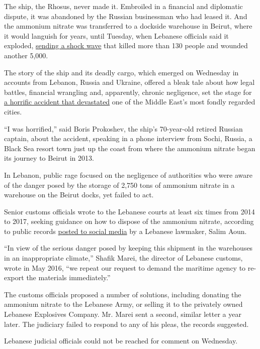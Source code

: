 The ship, the Rhosus, never made it. Embroiled in a financial and
diplomatic dispute, it was abandoned by the Russian businessman who had
leased it. And the ammonium nitrate was transferred to a dockside
warehouse in Beirut, where it would languish for years, until Tuesday,
when Lebanese officials said it exploded,
\href{https://www.nytimes.com/2020/08/04/world/middleeast/lebanon-explosion.html}{sending
a shock wave} that killed more than 130 people and wounded another
5,000.

The story of the ship and its deadly cargo, which emerged on Wednesday
in accounts from Lebanon, Russia and Ukraine, offered a bleak tale about
how legal battles, financial wrangling and, apparently, chronic
negligence, set the stage for
\href{https://www.nytimes.com/interactive/2020/08/04/world/middleeast/beirut-explosion-damage.html}{a
horrific accident that devastated} one of the Middle East's most fondly
regarded cities.

``I was horrified,'' said Boris Prokoshev, the ship's 70-year-old
retired Russian captain, about the accident, speaking in a phone
interview from Sochi, Russia, a Black Sea resort town just up the coast
from where the ammonium nitrate began its journey to Beirut in 2013.

In Lebanon, public rage focused on the negligence of authorities who
were aware of the danger posed by the storage of 2,750 tons of ammonium
nitrate in a warehouse on the Beirut docks, yet failed to act.

Senior customs officials wrote to the Lebanese courts at least six times
from 2014 to 2017, seeking guidance on how to dispose of the ammonium
nitrate, according to public records
\href{https://twitter.com/SalimAoun/status/1290799728960180227}{posted
to social media} by a Lebanese lawmaker, Salim Aoun.

``In view of the serious danger posed by keeping this shipment in the
warehouses in an inappropriate climate,'' Shafik Marei, the director of
Lebanese customs, wrote in May 2016, ``we repeat our request to demand
the maritime agency to re-export the materials immediately.''

The customs officials proposed a number of solutions, including donating
the ammonium nitrate to the Lebanese Army, or selling it to the
privately owned Lebanese Explosives Company. Mr. Marei sent a second,
similar letter a year later. The judiciary failed to respond to any of
his pleas, the records suggested.

Lebanese judicial officials could not be reached for comment on
Wednesday.

